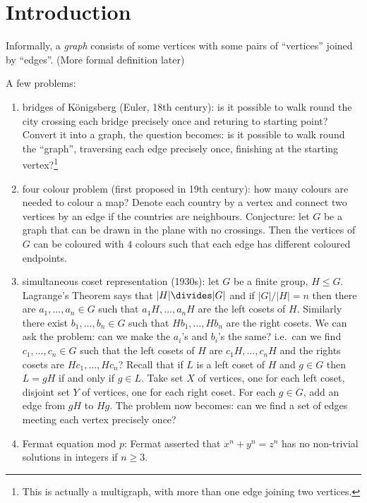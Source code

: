 \documentclass[a4paper]{article}
\begin{document}


\setcounter{section}{-1}

\section{Introduction}

Informally, a \emph{graph} consists of some vertices with some pairs of ``vertices'' joined by ``edges''. (More formal definition later)

A few problems:
\begin{enumerate}
\item bridges of Königsberg (Euler, 18th century): is it possible to walk round the city crossing each bridge precisely once and returing to starting point? Convert it into a graph, the question becomes: is it possible to walk round the ``graph'', traversing each edge precisely once, finishing at the starting vertex?\footnote{This is actually a multigraph, with more than one edge joining two vertices.}
\item four colour problem (first proposed in 19th century): how many colours are needed to colour a map? Denote each country by a vertex and connect two vertices by an edge if the countries are neighbours. Conjecture: let \(G\) be a graph that can be drawn in the plane with no crossings. Then the vertices of \(G\) can be coloured with \(4\) colours such that each edge has different coloured endpoints.
\item simultaneous coset representation (1930s): let \(G\) be a finite group, \(H \leq G\). Lagrange's Theorem says that \(|H| \divides |G|\) and if \(|G|/|H| = n\) then there are \(a_1, \dots, a_n \in G\) such that \(a_1H, \dots, a_nH\) are the left cosets of \(H\). Similarly there exist \(b_1, \dots, b_n \in G\) such that \(Hb_1, \dots, Hb_n\) are the right cosets. We can ask the problem: can we make the \(a_i\)'s and \(b_i\)'s the same? i.e.\ can we find \(c_1, \dots, c_n \in G\) such that the left cosets of \(H\) are \(c_1H, \dots, c_nH\) and the rights cosets are \(Hc_1, \dots, Hc_n\)? Recall that if \(L\) is a left coset of \(H\) and \(g \in G\) then \(L = gH\) if and only if \(g \in L\). Take set \(X\) of vertices, one for each left coset, disjoint set \(Y\) of vertices, one for each right coset. For each \(g \in G\), add an edge from \(gH\) to \(Hg\). The problem now becomes: can we find a set of edges meeting each vertex precisely once?
\item Fermat equation mod \(p\): Fermat asserted that \(x^n + y^n = z^n\) has no non-trivial solutions in integers if \(n \geq 3\). 


\end{enumerate}
\end{document}
